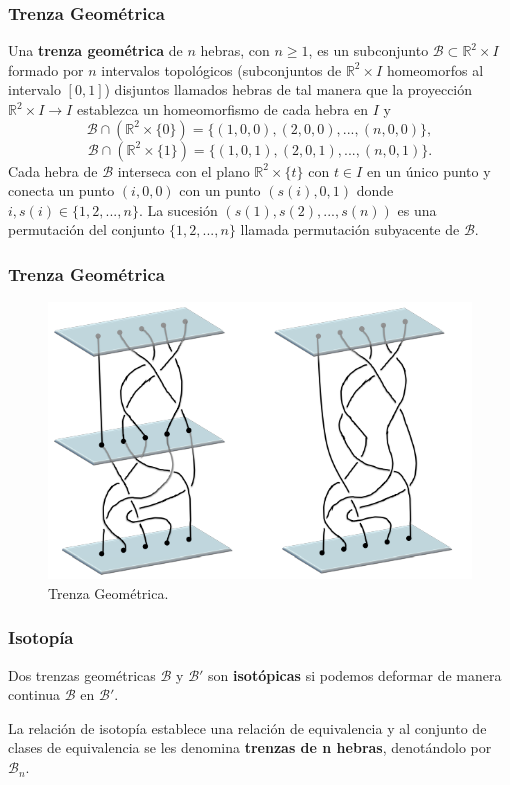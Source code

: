\documentclass{beamer}
\begin{document}
\begin{frame}
\frametitle{Trenza Geométrica}

Una \textbf{trenza geométrica} de $n$ hebras, con $n \geq 1$, es un subconjunto $\mathcal{B}\subset\mathbb{R}^2\times I$ formado por $n$ intervalos topológicos (subconjuntos de $\mathbb{R}^2\times I$ homeomorfos al intervalo $[0,1]$) disjuntos llamados hebras de tal manera que la proyección $\mathbb{R}^2\times I\rightarrow I$ establezca un homeomorfismo de cada hebra en $I$ y
$$\mathcal{B}\cap(\mathbb{R}^2\times \{0\})=\{(1,0,0),(2,0,0),...,(n,0,0)\},$$
$$\mathcal{B}\cap(\mathbb{R}^2\times \{1\})=\{(1,0,1),(2,0,1),...,(n,0,1)\}.$$
Cada hebra de $\mathcal{B}$ interseca con el plano $\mathbb{R}^2\times \{t\}$ con $t\in I$ en un único punto y conecta un punto $(i,0,0)$ con un punto $(s(i),0,1)$ donde $i,s(i)\in\{1,2,...,n\}$. La sucesión $(s(1),s(2),...,s(n))$ es una permutación del conjunto $\{1,2,...,n\}$ llamada permutación subyacente de $\mathcal{B}$.
\end{frame}





\begin{frame}
\frametitle{Trenza Geométrica}

\begin{figure}
\includegraphics[height=0.5\textwidth]{imgs/trenza_geo}
\caption{Trenza Geométrica.}
\end{figure}

\end{frame}


\begin{frame}
\frametitle{Isotopía}


Dos trenzas geométricas $\mathcal{B}$ y $\mathcal{B}'$ son \textbf{isotópicas} si podemos deformar de manera continua $\mathcal{B}$ en $\mathcal{B}'$.
\newline

La relación de isotopía establece una relación de equivalencia y al conjunto de clases de equivalencia se les denomina \textbf{trenzas de n hebras}, denotándolo por $\mathcal{B}_n$.


\end{frame}
\end{document}
